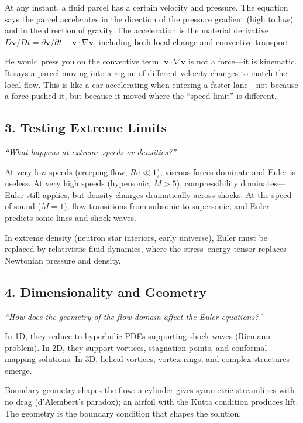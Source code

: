 At any instant, a fluid parcel has a certain velocity and pressure. The equation says the parcel accelerates in the direction of the pressure gradient (high to low) and in the direction of gravity. The acceleration is the material derivative $D\mathbf{v}/Dt = \partial\mathbf{v}/\partial t + \mathbf{v} \cdot \nabla\mathbf{v}$, including both local change and convective transport.

He would press you on the convective term: $\mathbf{v} \cdot \nabla\mathbf{v}$ is not a force---it is kinematic. It says a parcel moving into a region of different velocity changes to match the local flow. This is like a car accelerating when entering a faster lane---not because a force pushed it, but because it moved where the ``speed limit'' is different.

\subsection*{3. Testing Extreme Limits}
\textit{``What happens at extreme speeds or densities?''}

At very low speeds (creeping flow, $Re \ll 1$), viscous forces dominate and Euler is useless. At very high speeds (hypersonic, $M > 5$), compressibility dominates---Euler still applies, but density changes dramatically across shocks. At the speed of sound ($M = 1$), flow transitions from subsonic to supersonic, and Euler predicts sonic lines and shock waves.

In extreme density (neutron star interiors, early universe), Euler must be replaced by relativistic fluid dynamics, where the stress--energy tensor replaces Newtonian pressure and density.

\subsection*{4. Dimensionality and Geometry}
\textit{``How does the geometry of the flow domain affect the Euler equations?''}

In 1D, they reduce to hyperbolic PDEs supporting shock waves (Riemann problem). In 2D, they support vortices, stagnation points, and conformal mapping solutions. In 3D, helical vortices, vortex rings, and complex structures emerge.

Boundary geometry shapes the flow: a cylinder gives symmetric streamlines with no drag (d'Alembert's paradox); an airfoil with the Kutta condition produces lift. The geometry is the boundary condition that shapes the solution.

